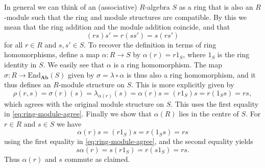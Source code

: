 \documentclass[article, a4paper, 11pt, oneside]{memoir}
\let\mathfrak\undefined
\numberwithin{equation}{chapter}
\newcommand{\ncat}[1]{\mathbf{#1}} %
\newcommand{\catAb}{\ncat{Ab}} %
\newcommand{\End}{\mathrm{End}}
\theoremstyle{nonumberplain}
\begin{document}
\begin{remarkbreak}[$R$-algebras]
    In general we can think of an (associative) $R$-algebra $S$ as a ring that is also an $R$-module such that the ring and module structures are compatible. By this we mean that the ring addition and the module addition coincide, and that
    \begin{equation}
        \label{eq:ring-module-agree}
        (rs)s' = r(ss') = s(rs')
    \end{equation}
    for all $r \in R$ and $s,s' \in S$. To recover the definition in terms of ring homomorphisms, define a map $\alpha \colon R \to S$ by $\alpha(r) = r 1_S$, where $1_S$ is the ring identity in $S$. We easily see that $\alpha$ is a ring homomorphism. The map $\sigma \colon R \to \End_\catAb(S)$ given by $\sigma = \lambda \circ \alpha$ is thus also a ring homomorphism, and it thus defines an $R$-module structure on $S$. This is more explicitly given by
    \begin{equation*}
        \rho(r,s)
            = \sigma(r)(s)
            = \lambda_{\alpha(r)}(s)
            = \alpha(r)s
            = (r 1_S) s
            = r (1_S s)
            = rs,
    \end{equation*}
    which agrees with the original module structure on $S$. This uses the first equality in \cref{eq:ring-module-agree}. Finally we show that $\alpha(R)$ lies in the centre of $S$. For $r \in R$ and $s \in S$ we have
    \begin{equation*}
        \alpha(r)s
            = (r 1_S)s
            = r (1_S s)
            = rs
    \end{equation*}
    using the first equality in \cref{eq:ring-module-agree}, and the second equality yields
    \begin{equation*}
        s \alpha(r)
            = s (r 1_S)
            = r (s 1_S)
            = rs.
    \end{equation*}
    Thus $\alpha(r)$ and $s$ commute as claimed.
\end{remarkbreak}

\newcommand{\frakS}{\mathfrak{S}}
\end{document}
